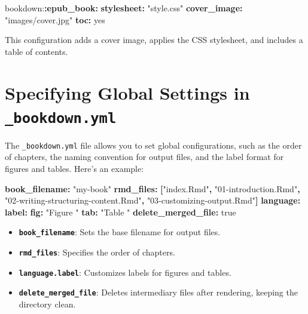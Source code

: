 \documentclass[
]{book}
\newenvironment{Shaded}{\begin{snugshade}}{\end{snugshade}}
\newcommand{\AttributeTok}[1]{\textcolor[rgb]{0.13,0.29,0.53}{#1}}
\newcommand{\CharTok}[1]{\textcolor[rgb]{0.31,0.60,0.02}{#1}}
\newcommand{\FunctionTok}[1]{\textcolor[rgb]{0.13,0.29,0.53}{\textbf{#1}}}
\newcommand{\KeywordTok}[1]{\textcolor[rgb]{0.13,0.29,0.53}{\textbf{#1}}}
\newcommand{\StringTok}[1]{\textcolor[rgb]{0.31,0.60,0.02}{#1}}
\providecommand{\tightlist}{%
  \setlength{\itemsep}{0pt}\setlength{\parskip}{0pt}}
\theoremstyle{definition}
\theoremstyle{definition}
\theoremstyle{definition}
\theoremstyle{definition}
\theoremstyle{remark}
\begin{document}
\begin{Shaded}
\begin{Highlighting}[]
\AttributeTok{bookdown:}\FunctionTok{:epub\_book}\KeywordTok{:}
\AttributeTok{  }\FunctionTok{stylesheet}\KeywordTok{:}\AttributeTok{ }\StringTok{"style.css"}
\AttributeTok{  }\FunctionTok{cover\_image}\KeywordTok{:}\AttributeTok{ }\StringTok{"images/cover.jpg"}
\AttributeTok{  }\FunctionTok{toc}\KeywordTok{:}\AttributeTok{ }\CharTok{yes}
\end{Highlighting}
\end{Shaded}

This configuration adds a cover image, applies the CSS stylesheet, and includes a table of contents.

\section{\texorpdfstring{Specifying Global Settings in \texttt{\_bookdown.yml}}{Specifying Global Settings in \_bookdown.yml}}\label{specifying-global-settings-in-_bookdown.yml}

The \texttt{\_bookdown.yml} file allows you to set global configurations, such as the order of chapters, the naming convention for output files, and the label format for figures and tables. Here's an example:

\begin{Shaded}
\begin{Highlighting}[]
\FunctionTok{book\_filename}\KeywordTok{:}\AttributeTok{ }\StringTok{"my{-}book"}
\FunctionTok{rmd\_files}\KeywordTok{:}\AttributeTok{ }\KeywordTok{[}\StringTok{"index.Rmd"}\KeywordTok{,}\AttributeTok{ }\StringTok{"01{-}introduction.Rmd"}\KeywordTok{,}\AttributeTok{ }\StringTok{"02{-}writing{-}structuring{-}content.Rmd"}\KeywordTok{,}\AttributeTok{ }\StringTok{"03{-}customizing{-}output.Rmd"}\KeywordTok{]}
\FunctionTok{language}\KeywordTok{:}
\AttributeTok{  }\FunctionTok{label}\KeywordTok{:}
\AttributeTok{    }\FunctionTok{fig}\KeywordTok{:}\AttributeTok{ }\StringTok{"Figure "}
\AttributeTok{    }\FunctionTok{tab}\KeywordTok{:}\AttributeTok{ }\StringTok{"Table "}
\FunctionTok{delete\_merged\_file}\KeywordTok{:}\AttributeTok{ }\CharTok{true}
\end{Highlighting}
\end{Shaded}

\begin{itemize}
\tightlist
\item
  \textbf{\texttt{book\_filename}}: Sets the base filename for output files.
\item
  \textbf{\texttt{rmd\_files}}: Specifies the order of chapters.
\item
  \textbf{\texttt{language.label}}: Customizes labels for figures and tables.
\item
  \textbf{\texttt{delete\_merged\_file}}: Deletes intermediary files after rendering, keeping the directory clean.
\end{itemize}
\end{document}
